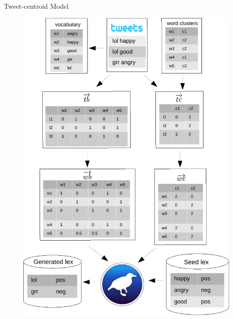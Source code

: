 \documentclass[handout]{beamer}
\begin{document}
\begin{frame}{Tweet-centroid Model}

\begin{figure}[htb]
	\centering
	 \includegraphics[scale=0.4]{pics/sigirmodel.pdf}
\end{figure}



\end{frame}
\end{document}
